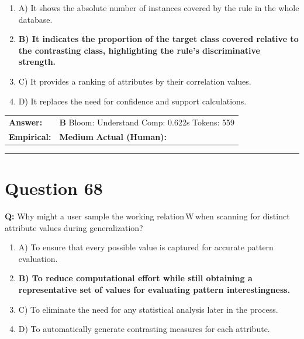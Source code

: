 \documentclass[9pt]{article}
\begin{document}
\begin{enumerate}[label=\textbf{\alph{*})}, nosep]
    \item A) It shows the absolute number of instances covered by the rule in the whole database.
    \item \textbf{B) It indicates the proportion of the target class covered relative to the contrasting class, highlighting the rule’s discriminative strength.} %
    \item C) It provides a ranking of attributes by their correlation values.
    \item D) It replaces the need for confidence and support calculations.

\end{enumerate}

\begin{tabular}{@{}l p{10.5cm}@{}}
\textbf{Answer:} & \textbf{B} \hspace{1em} Bloom: Understand \hspace{1em} Comp: 0.622s \hspace{1em} Tokens: 559 \\
\textbf{Empirical:} & \textbf{Medium} \hspace{1em} \textbf{Actual (Human):} \underline{\hspace{5cm}}
\end{tabular}

\vspace{0.2cm}
\rule{\textwidth}{0.4pt}
\vspace{0.2cm}


\section*{Question 68}

\textbf{Q:} Why might a user sample the working relation W when scanning for distinct attribute values during generalization?

\begin{enumerate}[label=\textbf{\alph{*})}, nosep]
    \item A) To ensure that every possible value is captured for accurate pattern evaluation.
    \item \textbf{B) To reduce computational effort while still obtaining a representative set of values for evaluating pattern interestingness.} %
    \item C) To eliminate the need for any statistical analysis later in the process.
    \item D) To automatically generate contrasting measures for each attribute.

\end{enumerate}
\end{document}
